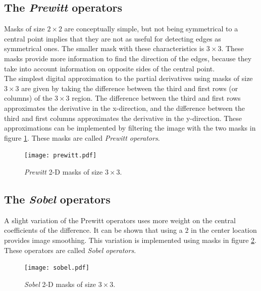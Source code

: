 \documentclass{ipol}
\numberwithin{equation}{section}
\numberwithin{table}{section}
\numberwithin{figure}{section}
\begin{document}

\subsection{The \textit{Prewitt} operators}

Masks of size $2\times2$ are conceptually simple, but not being symmetrical to a central point implies 
that they are not as useful for detecting edges as symmetrical ones. The smaller mask with these characteristics is 
$3\times3$. These masks provide more information to find the direction of the edges, because they take 
into account information on opposite sides of the central point.\\

The simplest digital approximation to the partial derivatives using masks of size $3\times3$ are given 
by taking the difference between the third and first rows (or columns) of the $3\times3$ region. The
difference between the third and first rows approximates the derivative in the x-direction, and 
the difference between the third and first columns approximates the derivative in the y-direction.
These approximations can be implemented by filtering the image with the two masks in figure \ref{fig:prewitt}.
These masks are called \textit{Prewitt operators}.\\

\begin{figure}
	\centering
	\texttt{[image: prewitt.pdf]}
	\caption{\textit{Prewitt} 2-D masks of size $3\times3$.}
	\label{fig:prewitt}
\end{figure}


\subsection{The \textit{Sobel} operators}

A slight variation of the Prewitt operators uses more weight on the central coefficients of the 
difference. It can be shown that using a $2$ in the center location provides image smoothing. This
variation is implemented using masks in figure \ref{fig:sobel}. These operators are called 
\textit{Sobel operators}.\\

\begin{figure}
	\centering
	\texttt{[image: sobel.pdf]}
	\caption{\textit{Sobel} 2-D masks of size $3\times3$.}
	\label{fig:sobel}
\end{figure}
\end{document}
